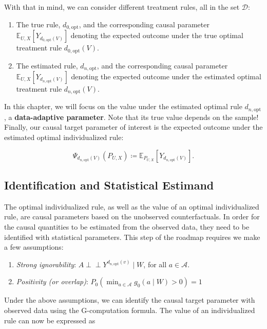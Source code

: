 \documentclass[
  12pt, krantz2,
]{krantz}
\providecommand{\tightlist}{%
  \setlength{\itemsep}{0pt}\setlength{\parskip}{0pt}}
\newcommand{\E}{\mathbb{E}}
\newcommand{\1}{\mathbbm{1}}
\newcommand{\indep}{\mbox{$\perp\!\!\!\perp$}}
\theoremstyle{definition}
\theoremstyle{definition}
\theoremstyle{definition}
\theoremstyle{definition}
\theoremstyle{remark}
\begin{document}
With that in mind, we can consider different
treatment rules, all in the set \(\mathcal{D}\):

\begin{enumerate}
\def\labelenumi{\arabic{enumi}.}
\item
  The true rule, \(d_{0,\text{opt}}\), and the corresponding causal parameter
  \(\E_{U,X}[Y_{d_{0,\text{opt}}(V)}]\) denoting the expected outcome under the
  true optimal treatment rule \(d_{0,\text{opt}}(V)\).
\item
  The estimated rule, \(d_{n,\text{opt}}\), and the corresponding causal parameter
  \(\E_{U,X}[Y_{d_{n,\text{opt}}(V)}]\) denoting the expected outcome under the
  estimated optimal treatment rule \(d_{n,\text{opt}}(V)\).
\end{enumerate}

In this chapter, we will focus on the value under the estimated optimal rule \(d_{n,\text{opt}}\),
a \textbf{data-adaptive parameter}. Note that its true value depends on the sample! Finally,
our causal target parameter of interest is the expected outcome under
the estimated optimal individualized rule:

\[\Psi_{d_{n, \text{opt}}(V)}(P_{U,X}) \coloneqq \E_{P_{U,X}}[Y_{d_{n,
\text{opt}}(V)}].\]

\hypertarget{identification-and-statistical-estimand}{%
\subsection{Identification and Statistical Estimand}\label{identification-and-statistical-estimand}}

The optimal individualized rule, as well as the value of an optimal
individualized rule, are causal parameters based on the unobserved
counterfactuals. In order for the causal quantities to be estimated from the
observed data, they need to be identified with statistical parameters. This step
of the roadmap requires we make a few assumptions:

\begin{enumerate}
\def\labelenumi{\arabic{enumi}.}
\tightlist
\item
  \emph{Strong ignorability}: \(A \indep Y^{d_{n, \text{opt}}(v)} \mid W\), for all \(a \in \mathcal{A}\).
\item
  \emph{Positivity (or overlap)}: \(P_0(\min_{a \in \mathcal{A}} g_0(a \mid W) > 0) = 1\)
\end{enumerate}

Under the above assumptions, we can identify the causal target parameter
with observed data using the G-computation formula. The value of an individualized
rule can now be expressed as
\end{document}
